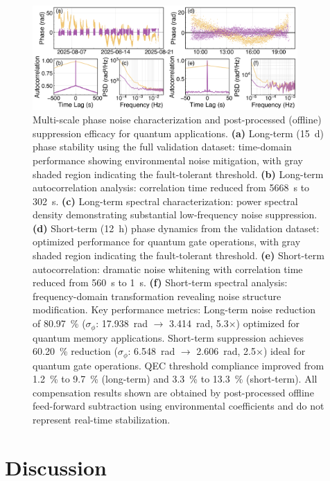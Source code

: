 \documentclass[aps,pra,reprint,groupedaddress,twocolumn,superscriptaddress]{revtex4-2}
\begin{document}
\begin{figure}
\centering
\includegraphics[width=0.9\textwidth]{figures/combined_figure.png}
\caption{
Multi-scale phase noise characterization and post-processed (offline) suppression efficacy for quantum applications. 
\textbf{(a)} Long-term (\SI{15}{\day}) phase stability using the full validation dataset: time-domain performance showing environmental noise mitigation, with gray shaded region indicating the fault-tolerant threshold. 
\textbf{(b)} Long-term autocorrelation analysis: correlation time reduced from \SI{5668}{\second} to \SI{302}{\second}. 
\textbf{(c)} Long-term spectral characterization: power spectral density demonstrating substantial low-frequency noise suppression. 
\textbf{(d)} Short-term (\SI{12}{\hour}) phase dynamics from the validation dataset: optimized performance for quantum gate operations, with gray shaded region indicating the fault-tolerant threshold. 
\textbf{(e)} Short-term autocorrelation: dramatic noise whitening with correlation time reduced from \SI{560}{\second} to \SI{1}{\second}. 
\textbf{(f)} Short-term spectral analysis: frequency-domain transformation revealing noise structure modification. 
Key performance metrics: Long-term noise reduction of \SI{80.97}{\percent} ($\sigma_\phi$: \SI{17.938}{\radian} $\rightarrow$ \SI{3.414}{\radian}, 5.3$\times$) optimized for quantum memory applications. Short-term suppression achieves \SI{60.20}{\percent} reduction ($\sigma_\phi$: \SI{6.548}{\radian} $\rightarrow$ \SI{2.606}{\radian}, 2.5$\times$) ideal for quantum gate operations. QEC threshold compliance improved from \SI{1.2}{\percent} to \SI{9.7}{\percent} (long-term) and \SI{3.3}{\percent} to \SI{13.3}{\percent} (short-term). 
All compensation results shown are obtained by post-processed offline feed-forward subtraction using environmental coefficients and do not represent real-time stabilization.
}
\label{fig:timeseries_comparison}
\end{figure}

\section{Discussion}
\label{sec:discussion}
\end{document}
